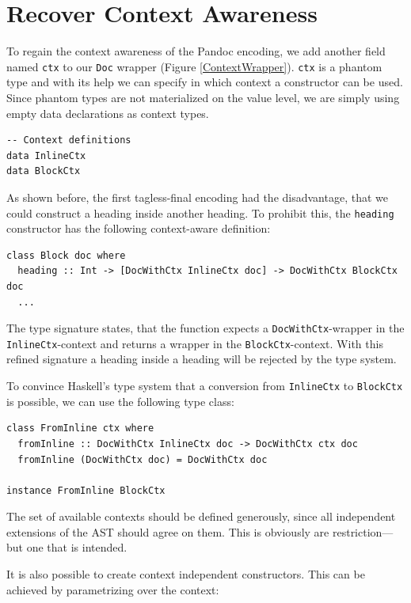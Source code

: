 \section{Recover Context Awareness}

To regain the context awareness of the Pandoc encoding, we add another field
named \texttt{ctx} to our \texttt{Doc} wrapper (Figure \ref{ContextWrapper}).
\texttt{ctx} is a phantom type and with its help we can specify in which
context a constructor can be used. Since phantom types are not materialized on
the value level, we are simply using empty data declarations as context types.

\begin{lstlisting}
-- Context definitions
data InlineCtx
data BlockCtx
\end{lstlisting}

As shown before, the first tagless-final encoding had the disadvantage, that we
could construct a heading inside another heading. To prohibit this, the
\texttt{heading} constructor has the following context-aware definition:

\begin{lstlisting}
class Block doc where
  heading :: Int -> [DocWithCtx InlineCtx doc] -> DocWithCtx BlockCtx doc
  ...
\end{lstlisting}

The type signature states, that the function expects a
\texttt{DocWithCtx}-wrapper in the \texttt{InlineCtx}-context and returns a
wrapper in the \texttt{BlockCtx}-context. With this refined signature a heading
inside a heading will be rejected by the type system.

To convince Haskell’s type system that a conversion from \texttt{InlineCtx} to
\texttt{BlockCtx} is possible, we can use the following type class:

\begin{lstlisting}
class FromInline ctx where
  fromInline :: DocWithCtx InlineCtx doc -> DocWithCtx ctx doc
  fromInline (DocWithCtx doc) = DocWithCtx doc

instance FromInline BlockCtx
\end{lstlisting}


The set of available contexts should be defined generously, since all
independent extensions of the AST should agree on them. This is obviously are
restriction—but one that is intended.

It is also possible to create context independent constructors. This can be
achieved by parametrizing over the context:

